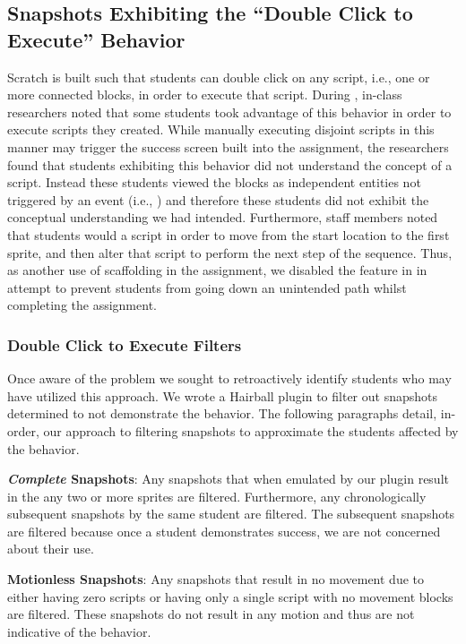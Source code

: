 \subsection{Snapshots Exhibiting the ``Double Click to Execute'' Behavior}
Scratch is built such that students can double click on any script, i.e., one
or more connected blocks, in order to execute that script. During \sone{},
in-class researchers noted that some students took advantage of this behavior
in order to execute scripts they created. While manually executing disjoint
scripts in this manner may trigger the success screen built into the
assignment, the researchers found that students exhibiting this behavior did
not understand the concept of a script. Instead these students viewed the
blocks as independent entities not triggered by an event (i.e., \netclicked)
and therefore these students did not exhibit the conceptual understanding we
had intended. Furthermore, staff members noted that students would \dce{} a
script in order to move from the start location to the first sprite, and then
alter that script to perform the next step of the sequence. Thus, as another
use of scaffolding in the assignment, we disabled the \dce{} feature in \stwo{}
in attempt to prevent students from going down an unintended path whilst
completing the assignment.

\subsubsection{Double Click to Execute Filters}
Once aware of the problem we sought to retroactively identify students who may
have utilized this \dce{} approach. We wrote a Hairball plugin to filter out
snapshots determined to not demonstrate the \dce{} behavior. The following
paragraphs detail, in-order, our approach to filtering snapshots to approximate
the students affected by the \dce{} behavior.

\textbf{\emph{Complete} Snapshots}: Any snapshots that when emulated by our
plugin result in the \net{}  any two or more sprites are
filtered. Furthermore, any chronologically subsequent snapshots by the same
student are filtered. The subsequent snapshots are filtered because once a
student demonstrates success, we are not concerned about their \dce{} use.

\textbf{Motionless Snapshots}: Any snapshots that result in no movement due to
either having zero scripts or having only a single \netclicked{} script with no
movement blocks are filtered. These snapshots do not result in any motion and
thus are not indicative of the \dce{} behavior.

